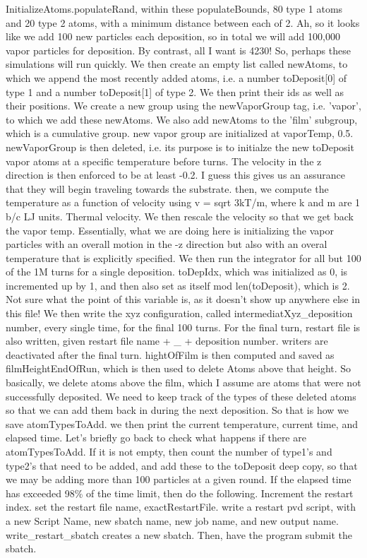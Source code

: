 \documentclass[12pt,reqno]{amsart}
\numberwithin{equation}{section}
\begin{document}
\begin{enumerate}
InitializeAtoms.populateRand, within these populateBounds, 80 type 1 atoms and 20 type 2 atoms, with a minimum distance between each of 2.  Ah, so it looks like we add 100 new particles each deposition, so in total we will add 100,000 vapor particles for deposition.  By contrast, all I want is 4230!  So, perhaps these simulations will run quickly.    We then create an empty list called newAtoms, to which we append the most recently added atoms, i.e. a number toDeposit[0] of type 1 and a number toDeposit[1] of type 2.  We then print their ids as well as their positions.  We create a new group using the newVaporGroup tag, i.e. 'vapor', to which we add these newAtoms.  We also add newAtoms to the 'film' subgroup, which is a cumulative group.  new vapor group are initialized at vaporTemp, 0.5.  newVaporGroup is then deleted, i.e. its purpose is to initialze the new toDeposit vapor atoms at a specific temperature before turns.  The velocity in the z direction is then enforced to be at least -0.2.  I guess this gives us an assurance that they will begin traveling towards the substrate.  then, we compute the temperature as a function of velocity using v = sqrt 3kT/m, where k and m are 1 b/c LJ units.  Thermal velocity.  We then rescale the velocity so that we get back the vapor temp.  Essentially, what we are doing here is initializing the vapor particles with an overall motion in the -z direction but also with an overal temperature that is explicitly specified.  We then run the integrator for all but 100 of the 1M turns for a single deposition.  toDepIdx, which was initialized as 0, is incremented up by 1, and then also set as itself mod len(toDeposit), which is 2.  Not sure what the point of this variable is, as it doesn't show up anywhere else in this file!  We then write the xyz configuration, called intermediatXyz\_deposition number, every single time, for the final 100 turns.  For the final turn, restart file is also written, given restart file name + \_ + deposition number.  writers are deactivated after the final turn.  hightOfFilm is then computed and saved as filmHeightEndOfRun, which is then used to delete Atoms above that height. So basically, we delete atoms above the film, which I assume are atoms that were not successfully deposited.  We need to keep track of the types of these deleted atoms so that we can add them back in during the next deposition.  So that is how we save atomTypesToAdd.  we then print the current temperature, current time, and elapsed time.  Let's briefly go back to check what happens if there are atomTypesToAdd.  If it is not empty, then count the number of type1's and type2's that need to be added, and add these to the toDeposit deep copy, so that we may be adding more than 100 particles at a given round.  If the elapsed time has exceeded 98\% of the time limit, then do the following.  Increment the restart index.  set the restart file name, exactRestartFile.  write a restart pvd script, with a new Script Name, new sbatch name, new job name, and new output name.  write\_restart\_sbatch creates a new sbatch.  Then, have the program submit the sbatch.  

\end{enumerate}
\end{document}
